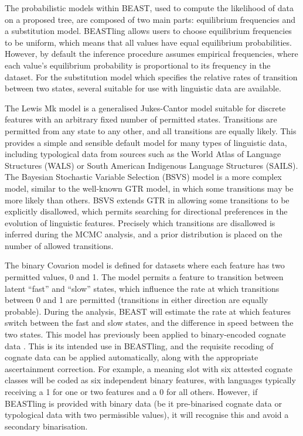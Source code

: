 \documentclass[10pt,a4paper]{article}
\begin{document}
The probabilistic models within BEAST, used to compute the likelihood of data on a proposed tree, are composed of two main parts: equilibrium frequencies and a substitution model.  BEASTling allows users to choose equilibrium frequencies to be uniform, which means that all values have equal equilibrium probabilities. However, by default the inference procedure assumes empirical frequencies, where each value's equilibrium probability is proportional to its frequency in the dataset.  For the substitution model which specifies the relative rates of transition between two states, several suitable for use with linguistic data are available.

The Lewis Mk model\cite{Lewis2001} is a generalised Jukes-Cantor model suitable for discrete features with an arbitrary fixed number of permitted states.  Transitions are permitted from any state to any other, and all transitions are equally likely.  This provides a simple and sensible default model for many types of linguistic data, including typological data from sources such as the World Atlas of Language Structures\cite{Dryer2013} (WALS) or South American Indigenous Language Structures\cite{Muysken2014} (SAILS).  The Bayesian Stochastic Variable Selection (BSVS) model is a more complex model, similar to the well-known GTR model, in which some transitions may be more likely than others.  BSVS extends GTR in allowing some transitions to be explicitly disallowed, which  permits searching for directional preferences in the evolution of linguistic features.  Precisely which transitions are disallowed is inferred during the MCMC analysis, and a prior distribution is placed on the number of allowed transitions.

The binary Covarion model\cite{Penny2001} is defined for datasets where each feature has two permitted values, 0 and 1.  The model permits a feature to transition between latent ``fast'' and ``slow'' states, which influence the rate at which transitions between 0 and 1 are permitted (transitions in either direction are equally probable).  During the analysis, BEAST will estimate the rate at which features switch between the fast and slow states, and the difference in speed between the two states.  This model has previously been applied to binary-encoded cognate data \cite{Gray2009,Bouckaert2012}.  This is its intended use in BEASTling, and the requisite recoding of cognate data can be applied automatically, along with the appropriate ascertainment correction.  For example, a meaning slot with six attested cognate classes will be coded as six independent binary features, with languages typically receiving a 1 for one or two features and a 0 for all others.  However, if BEASTling is provided with binary data (be it pre-binarised cognate data or typological data with two permissible values), it will recognise this and avoid a secondary binarisation.
\end{document}
